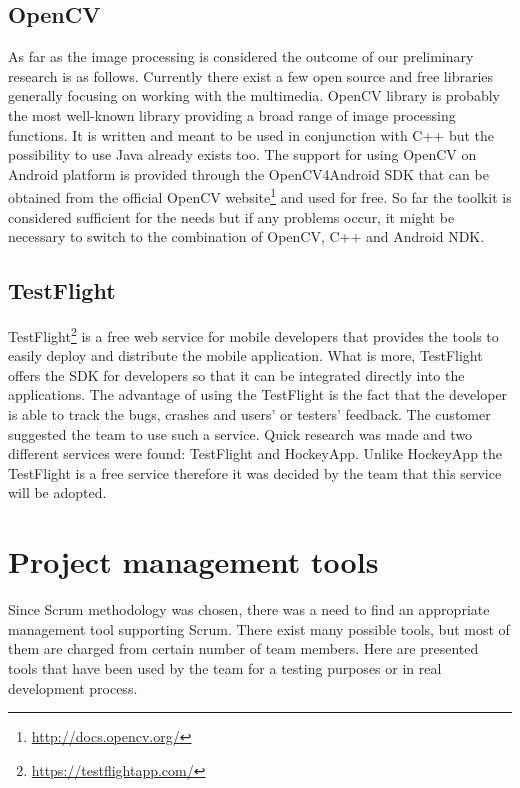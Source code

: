 \subsection{OpenCV} \label{subsec:image_processing_library}

As far as the image processing is considered the outcome of our preliminary research is as follows.
Currently there exist a few open source and free libraries generally focusing on working with the multimedia.
OpenCV library is probably the most well-known library providing a broad range of image processing functions.
It is written and meant to be used in conjunction with C++ but the possibility to use Java already exists too.
The support for using OpenCV on Android platform is provided through the OpenCV4Android SDK that can be obtained from the official OpenCV website\footnote{\url{http://docs.opencv.org/}} and used for free.
So far the toolkit is considered sufficient for the needs but if any problems occur, it might be necessary to switch to the combination of OpenCV, C++ and Android NDK.


\subsection{TestFlight}

TestFlight\footnote{\url{https://testflightapp.com/}} is a free web service for mobile developers that provides the tools to easily deploy and distribute the mobile application. 
What is more, TestFlight offers the SDK for developers so that it can be integrated directly into the applications. 
The advantage of using the TestFlight is the fact that the developer is able to track the bugs, crashes and users' or testers' feedback. 
The customer suggested the team to use such a service.
Quick research was made and two different services were found: TestFlight and HockeyApp. Unlike HockeyApp the TestFlight is a free service therefore it was decided by the team that this service will be adopted.


\section{Project management tools}
\label{sec:management_tools}
Since Scrum methodology was chosen, there was a need to find an appropriate management tool supporting Scrum.
There exist many possible tools, but most of them are charged from
certain number of team members. 
Here are presented tools that have been used by the team for a testing purposes or in real development process.

